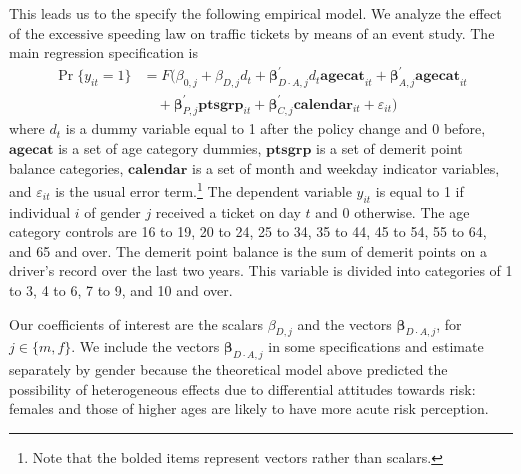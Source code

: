 This leads us to the specify the following empirical model.
% 
We analyze the effect of the excessive speeding law on traffic tickets 
by means of an event study. 
The main regression specification is
%
\begin{align*}
\Pr\{y_{it} = 1\} & 	
			= F( \beta_{0,j} + \beta_{D,j} d_t
      		+ \bm{\beta}_{D\cdot A,j}^{\prime} d_t \bm{agecat}_{it} 
	 		+ \bm{\beta}_{A,j}^{\prime} \bm{agecat}_{it} \\
         &	\quad
			+ \bm{\beta}_{P,j}^{\prime} \bm{ptsgrp}_{it}
      		+ \bm{\beta}_{C,j}^{\prime} \bm{calendar}_{it}
      		+ \varepsilon_{it} )
\end{align*}
%
where $d_t$ is a dummy variable equal to 
1 after the policy change and 0 before, 
$\bm{agecat}$ is a set of age category dummies, 
$\bm{ptsgrp}$ is a set of demerit point balance categories, 
$\bm{calendar}$ is a set of month and weekday indicator variables, 
and $\varepsilon_{it}$ is the usual error term.\footnote{%
Note that the bolded items represent vectors rather than scalars.}
%  
The dependent variable $y_{it}$ is equal to 1 if individual $i$ 
of gender $j$ 
received a ticket on day $t$ and 0 otherwise. 
The age category controls are 
16 to 19, 20 to 24, 25 to 34, 35 to 44, 45 to 54, 55 to 64, and 65 and over. 
The demerit point balance is the sum of demerit points 
on a driver’s record over the last two years. 
This variable is divided into categories of 1 to 3, 4 to 6, 7 to 9, and 10 and over.


Our coefficients of interest are 
the scalars $\beta_{D,j}$ and the vectors $\bm{\beta}_{D\cdot A,j}$, 
for $j \in \{ m, f\}$. 
We include the vectors $\bm{\beta}_{D\cdot A,j}$ in some specifications 
and estimate separately by gender because the theoretical model 
above predicted the possibility of heterogeneous effects 
due to differential attitudes towards risk: 
females and those of higher ages are likely 
to have more acute risk perception. 



